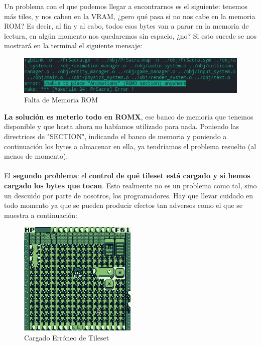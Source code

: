 Un problema con el que podemos llegar a encontrarnos es el siguiente: tenemos más tiles, y nos caben en la VRAM, ¿pero qué pasa si no nos cabe en la memoria ROM? Es decir, al fin y al cabo, todos esos bytes van a parar en la memoria de lectura, en algún momento nos quedaremos sin espacio, ¿no? Si esto sucede se nos mostrará en la terminal el siguiente mensaje:

\clearpage

\begin{figure}[h]
\centering
\includegraphics[width=1\textwidth]{include/images/desarrollo/NoRom.png}
\caption{Falta de Memoria ROM}
\label{figure:NoRom}
\end{figure}

\textbf{La solución es meterlo todo en ROMX}, ese banco de memoria que tenemos disponible y que hasta ahora no habíamos utilizado para nada. Poniendo las directrices de "SECTION", indicando el banco de memoria y poniendo a continuación los bytes a almacenar en ella, ya tendríamos el problema resuelto (al menos de momento).
\\ \\
El \textbf{segundo problema}: el \textbf{control de qué tileset está cargado y si hemos cargado los bytes que tocan}. Esto realmente no es un problema como tal, sino un descuido por parte de nosotros, los programadores. Hay que llevar cuidado en todo momento ya que se pueden producir efectos tan adversos como el que se muestra a continuación:

\begin{figure}[h]
\centering
\includegraphics[width=0.5\textwidth]{include/images/desarrollo/wrongtileset.png}
\caption{Cargado Erróneo de Tileset}
\label{figure:wrongtileset}
\end{figure}

